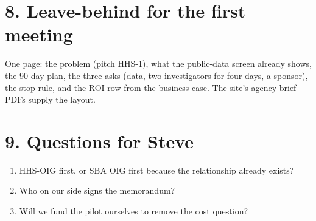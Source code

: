 \documentclass[letterpaper,11pt]{article}
\providecommand{\tightlist}{\setlength{\itemsep}{0pt}\setlength{\parskip}{0pt}}
\begin{document}
\hypertarget{leave-behind-for-the-first-meeting}{%
\section*{8. Leave-behind for the first
meeting}\label{leave-behind-for-the-first-meeting}}

One page: the problem (pitch HHS-1), what the public-data screen already
shows, the 90-day plan, the three asks (data, two investigators for four
days, a sponsor), the stop rule, and the ROI row from the business case.
The site's agency brief PDFs supply the layout.

\hypertarget{questions-for-steve}{%
\section*{9. Questions for Steve}\label{questions-for-steve}}

\begin{enumerate}
\def\labelenumi{\arabic{enumi}.}
\tightlist
\item
  HHS-OIG first, or SBA OIG first because the relationship already
  exists?
\item
  Who on our side signs the memorandum?
\item
  Will we fund the pilot ourselves to remove the cost question?
\end{enumerate}
\end{document}
